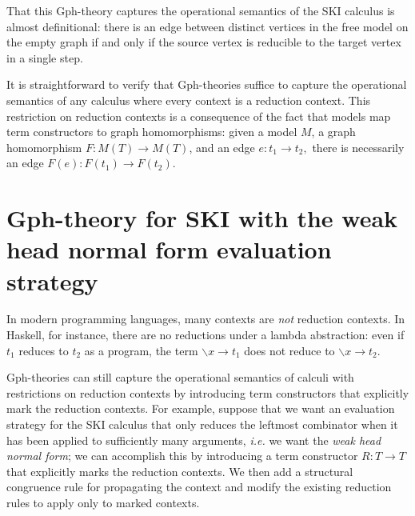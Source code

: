\documentclass[a4paper,UKenglish]{lipics-v2016}
\newcommand{\maps}{\colon}
\begin{document}
That this Gph-theory captures the operational semantics of the SKI calculus is almost definitional: there is an edge between distinct vertices in the free model on the empty graph if and only if the source vertex is reducible to the target vertex in a single step.

It is straightforward to verify that Gph-theories suffice to capture the operational semantics of any calculus where every context is a reduction context.  This restriction on reduction contexts is a consequence of the fact that models map term constructors to graph homomorphisms: given a model $M$, a graph homomorphism $F\maps M(T) \to M(T)$, and an edge $e\maps t_1 \to t_2,$ there is necessarily an edge $F(e)\maps F(t_1) \to F(t_2).$

\section{Gph-theory for SKI with the weak head normal form evaluation strategy}
\label{whnf}
In modern programming languages, many contexts are {\em not} reduction contexts.  In Haskell, for instance, there are no reductions under a lambda abstraction: even if $t_1$ reduces to $t_2$ as a program, the term $\backslash x \to t_1$ does not reduce to $\backslash x \to t_2.$

Gph-theories can still capture the operational semantics of calculi with restrictions on reduction contexts by introducing term constructors that explicitly mark the reduction contexts.  For example, suppose that we want an evaluation strategy for the SKI calculus that only reduces the leftmost combinator when it has been applied to sufficiently many arguments, {\em i.e.} we want the {\em weak head normal form}; we can accomplish this by introducing a term constructor $R\maps T \to T$ that explicitly marks the reduction contexts.  We then add a structural congruence rule for propagating the context and modify the existing reduction rules to apply only to marked contexts.
\end{document}
